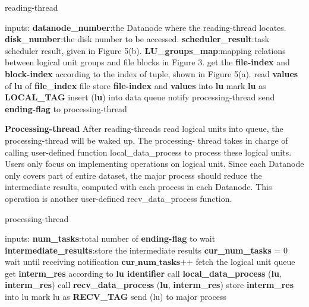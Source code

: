\documentclass[preprint,12pt]{elsarticle}
\begin{document}
\begin{algorithm}[htb]
\caption{reading-thread} 
\label{alg:reading-thread}
\begin{algorithmic}
\STATE inputs:
\STATE \textbf{datanode\_number}:the Datanode where the reading-thread locates.
\STATE \textbf{disk\_number}:the disk number to be accessed. 
\STATE \textbf{scheduler\_result}:task scheduler result, given in Figure 5(b).
\STATE \textbf{LU\_groups\_map}:mapping relations between logical unit groups and file blocks in Figure 3.
\newline
{} 
\STATE get the \textbf{file-index} and \textbf{block-index} according to the index of tuple, shown in Figure 5(a).
\STATE read \textbf{values} of \textbf{lu} of \textbf{file\_index} file
\STATE store \textbf{file-index} and \textbf{values} into \textbf{lu}
\STATE mark \textbf{lu} as \textbf{LOCAL\_TAG}
\STATE insert (\textbf{lu}) into data queue
\STATE notify processing-thread
\ENDFOR
\ENDIF
\ENDFOR
\STATE send \textbf{ending-flag} to processing-thread
\end{algorithmic}
\end{algorithm}

\textbf{Processing-thread} After reading-threads read logical units into queue, the processing-thread will be waked up. The processing-
thread takes in charge of calling user-defined function local\_data\_process to process these logical units. Users only focus on 
implementing operations on logical unit. Since each Datanode only covers part of entire dataset, the major process should reduce the 
intermediate results, computed with each process in each Datanode. This operation is another user-defined recv\_data\_process function. 

\begin{algorithm}[htb]
\caption{processing-thread} 
\label{alg:processing-thread}
\begin{algorithmic}
\STATE inputs:
\STATE \textbf{num\_tasks}:total number of \textbf{ending-flag} to wait
\STATE \textbf{intermediate\_results}:store the intermediate results
\newline
\STATE \textbf{cur\_num\_tasks} = 0
\STATE wait until receiving notification
\STATE $\textbf{cur\_num\_tasks++}$
\STATE fetch the logical unit queue
\STATE get \textbf{interm\_res} according to \textbf{lu identifier} 
\STATE call \textbf{local\_data\_process} (\textbf{lu}, \textbf{interm\_res})
\ENDIF
{}
\STATE call \textbf{recv\_data\_process} (\textbf{lu}, \textbf{interm\_res}) 
\ENDIF
{}
\STATE store \textbf{interm\_res} into lu
\STATE mark lu as \textbf{RECV\_TAG}
\STATE send (lu) to major process
\ENDIF
\ENDIF
\ENDFOR
\ENDIF
\ENDWHILE
\end{algorithmic}
\end{algorithm}
\end{document}
